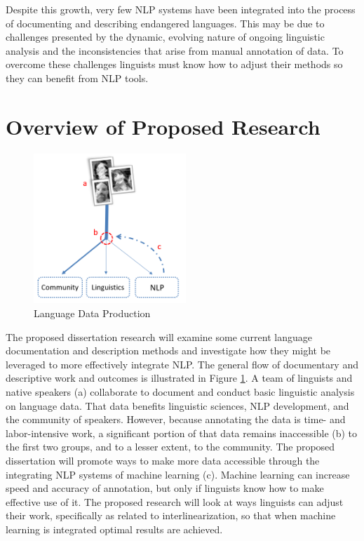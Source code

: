 Despite this growth, very few NLP systems have been integrated into the process of documenting and describing endangered languages. This may be due to challenges presented by the dynamic, evolving nature of ongoing linguistic analysis and the inconsistencies that arise from manual annotation of data. To overcome these challenges linguists must know how to adjust their methods
so they can benefit from NLP tools.


\section{Overview of Proposed Research}

\begin{figure}[b]
\centering
\includegraphics[width=5.75cm]{figs/Flowchart.PNG}
\caption[Language Data Production]{Language Data Production}
\label{fig:flowchart}
\end{figure}

The proposed dissertation research will examine some current language documentation and description methods and investigate how they might be leveraged to more effectively integrate NLP. The general flow of documentary and descriptive work and outcomes is illustrated in Figure \ref{fig:flowchart}. A team of linguists and native speakers (a) collaborate to document and conduct basic linguistic analysis on language data. That data benefits linguistic sciences, NLP development, and the community of speakers. However, because annotating the data is time- and labor-intensive work, a significant portion of that data remains inaccessible (b) to the first two groups, and to a lesser extent, to the community. The proposed dissertation will promote ways to make more data accessible through the integrating NLP systems of machine learning (c). Machine learning can increase %
speed and accuracy of annotation, but only if linguists know how to make effective use of it. The proposed research 
will look at ways linguists can adjust their work, specifically as related to interlinearization, so that when machine learning is integrated optimal results are achieved. 


